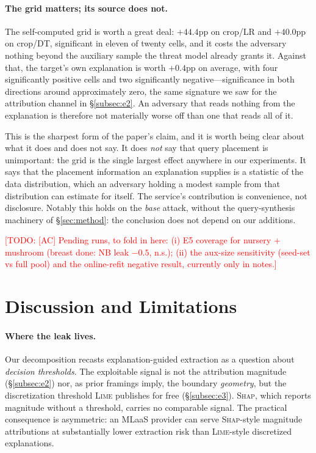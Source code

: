 \documentclass[sigconf,anonymous,review]{acmart}
\newcommand{\TODO}[1]{\textcolor{red}{[TODO: #1]}}
\begin{document}
\paragraph{The grid matters; its source does not.} The self-computed grid is worth a great deal:
$+44.4$pp on crop/LR and $+40.0$pp on crop/DT, significant in eleven of twenty cells, and it costs the
adversary nothing beyond the auxiliary sample the threat model already grants it. Against that, the
target's own explanation is worth $+0.4$pp on average, with four significantly positive cells and two
significantly negative---significance in both directions around approximately zero, the same signature
we saw for the attribution channel in \S\ref{subsec:e2}. An adversary that reads nothing from the
explanation is therefore not materially worse off than one that reads all of it.

This is the sharpest form of the paper's claim, and it is worth being clear about what it does and
does not say. It does \emph{not} say that query placement is unimportant: the grid is the single
largest effect anywhere in our experiments. It says that the placement information an explanation
supplies is a statistic of the data distribution, which an adversary holding a modest sample from that
distribution can estimate for itself. The service's contribution is convenience, not disclosure.
Notably this holds on the \emph{base} attack, without the query-synthesis machinery of
\S\ref{sec:method}: the conclusion does not depend on our additions.

\TODO{[AC] Pending runs, to fold in here: (i) E5 coverage for nursery + mushroom (breast done:
NB leak $-0.5$, n.s.); (ii) the aux-size sensitivity (seed-set vs full pool) and the online-refit
negative result, currently only in notes.}
\section{Discussion and Limitations}
\label{sec:discussion}
\paragraph{Where the leak lives.} Our decomposition recasts explanation-guided extraction as a
question about \emph{decision thresholds}. The exploitable signal is not the attribution magnitude
(\S\ref{subsec:e2}) nor, as prior framings imply, the boundary \emph{geometry}, but the discretization
threshold \textsc{Lime} publishes for free (\S\ref{subsec:e3}). \textsc{Shap}, which reports magnitude
without a threshold, carries no comparable signal. The practical consequence is asymmetric: an MLaaS
provider can serve \textsc{Shap}-style magnitude attributions at substantially lower extraction risk
than \textsc{Lime}-style discretized explanations.
\end{document}
